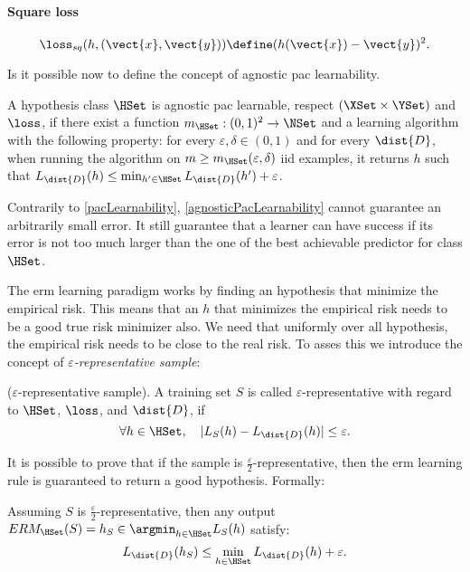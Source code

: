 \paragraph{Square loss}
\begin{equation*}
  \loss_{sq}(h,(\vect{x},\vect{y}))\define(h(\vect{x})-\vect{y})^2.
\end{equation*}

Is it possible now to define the concept of agnostic \ac{pac}
learnability.
\begin{definition}\label{agnosticPacLearnability}
A hypothesis class $\HSet$ is agnostic \ac{pac}
learnable, respect $(\XSet\times\YSet)$ and $\loss$, if there exist a
function $m_\HSet:(0,1)^2\rightarrow\NSet$ and a learning algorithm
with the following property: for every $\varepsilon,\delta\in(0,1)$
and for every $\dist{D}$, when running the algorithm on $m\geq
m_\HSet(\varepsilon,\delta)$ \ac{iid} examples, it returns $h$ such
that
$L_\dist{D}(h)\leq\min_{h'\in\HSet}L_\dist{D}(h')+\varepsilon$. 
\end{definition}

Contrarily to \cref{pacLearnability}, \cref{agnosticPacLearnability}
cannot guarantee an arbitrarily small error. It still guarantee that
a learner can have success if its error is not too much larger than
the one of the best achievable predictor for class $\HSet$.

The \ac{erm} learning paradigm works by finding an hypothesis that
minimize the empirical 
risk. This means that an $h$ that minimizes the empirical risk needs
to be a good true risk minimizer also. We need that uniformly over all
hypothesis, the empirical risk needs to be close to the real risk. To
asses this we introduce the concept of
\emph{$\varepsilon$-representative sample}: 
\begin{definition}
  ($\varepsilon$-representative sample). A training set $S$ is called
  $\varepsilon$-representative with regard to $\HSet$, $\loss$, and
  $\dist{D}$, if
  \begin{equation*}
    \forall h\in\HSet,\quad |L_S(h)-L_\dist{D}(h)|\leq\varepsilon.
  \end{equation*}
\end{definition}
It is possible to prove that if the sample is
$\frac{\varepsilon}{2}$-representative, then the \ac{erm} learning
rule is guaranteed to return a good hypothesis. Formally:
\begin{lemma}\label{ermgood}
  Assuming $S$ is $\frac{\varepsilon}{2}$-representative, then any
  output $ERM_\HSet(S)=h_S\in\argmin_{h\in\HSet}L_S(h)$ satisfy:
  \begin{equation*}
    L_\dist{D}(h_S)\leq\min_{h\in\HSet}L_\dist{D}(h)+\varepsilon.
  \end{equation*}
\end{lemma}

